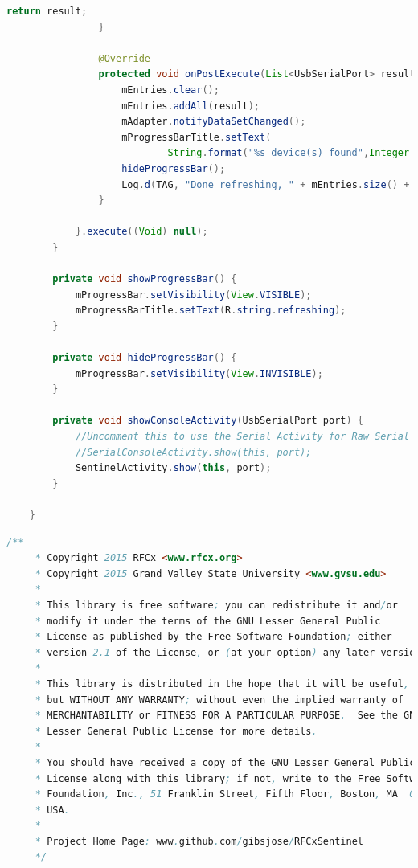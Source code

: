 \documentclass{article}
\numberwithin{figure}{section}
\numberwithin{equation}{section}
\begin{document}
{\begin{lstlisting}[language=Java,label=lst:devicelist,caption=DeviceListActivity.java]
                    return result;
                }

                @Override
                protected void onPostExecute(List<UsbSerialPort> result) {
                    mEntries.clear();
                    mEntries.addAll(result);
                    mAdapter.notifyDataSetChanged();
                    mProgressBarTitle.setText(
                            String.format("%s device(s) found",Integer.valueOf(mEntries.size())));
                    hideProgressBar();
                    Log.d(TAG, "Done refreshing, " + mEntries.size() + " entries found.");
                }

            }.execute((Void) null);
        }

        private void showProgressBar() {
            mProgressBar.setVisibility(View.VISIBLE);
            mProgressBarTitle.setText(R.string.refreshing);
        }

        private void hideProgressBar() {
            mProgressBar.setVisibility(View.INVISIBLE);
        }

        private void showConsoleActivity(UsbSerialPort port) {
            //Uncomment this to use the Serial Activity for Raw Serial Data
            //SerialConsoleActivity.show(this, port);
            SentinelActivity.show(this, port);
        }

    }
\end{lstlisting}

\begin{lstlisting}[language=Java,label=lst:sentlist,caption=SentinelActivity.java]
    /**
     * Copyright 2015 RFCx <www.rfcx.org>
     * Copyright 2015 Grand Valley State University <www.gvsu.edu>
     *
     * This library is free software; you can redistribute it and/or
     * modify it under the terms of the GNU Lesser General Public
     * License as published by the Free Software Foundation; either
     * version 2.1 of the License, or (at your option) any later version.
     *
     * This library is distributed in the hope that it will be useful,
     * but WITHOUT ANY WARRANTY; without even the implied warranty of
     * MERCHANTABILITY or FITNESS FOR A PARTICULAR PURPOSE.  See the GNU
     * Lesser General Public License for more details.
     *
     * You should have received a copy of the GNU Lesser General Public
     * License along with this library; if not, write to the Free Software
     * Foundation, Inc., 51 Franklin Street, Fifth Floor, Boston, MA  02110-1301,
     * USA.
     *
     * Project Home Page: www.github.com/gibsjose/RFCxSentinel
     */


\end{lstlisting}}
\end{document}
